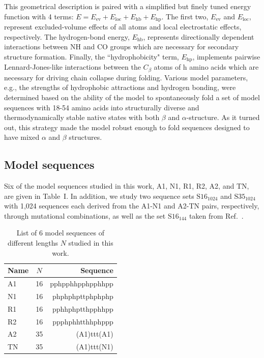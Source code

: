 \documentclass[
aip,
rsi,%
amsmath,amssymb,
reprint,%
]{revtex4-1}
\begin{document}
This geometrical description is paired with a simplified but finely tuned energy function with 4 terms: $E= E_\mathrm{ev} + E_\mathrm{loc} + E_\mathrm{hb} + E_\mathrm{hp}$. The first two, $E_\mathrm{ev}$ and $E_\mathrm{loc}$, represent excluded-volume effects of all atoms and local electrostatic effects, respectively. The hydrogen-bond energy, $E_\mathrm{hb}$, represents directionally dependent interactions between NH and CO groups which are necessary for secondary structure formation. Finally, the ``hydrophobicity" term, $E_\mathrm{hp}$, implements pairwise Lennard-Jones-like interactions between the $C_\beta$ atoms of h amino acids which are necessary for driving chain collapse during folding. Various model parameters, e.g., the strengths of hydrophobic attractions and hydrogen bonding, were determined based on the ability of the model to spontaneously fold a set of model sequences with 18-54 amino acids into  structurally diverse and thermodynamically stable native states with both $\beta$ and $\alpha$-structure. As it turned out, this strategy made the model robust enough to fold sequences designed to have mixed $\alpha$ and $\beta$ structures. 

\subsection{Model sequences}
\noindent
Six of the model sequences studied in this work, A1, N1, R1, R2, A2, and TN, are given in Table~I. In addition, we study two sequence sets $\mathrm{S16}_{1024}$  and $\mathrm{S35}_{1024}$ with 1,024 sequences each derived from the A1-N1 and A2-TN pairs, respectively, through mutational combinations, as well as the set $\mathrm{S16}_{144}$ taken from  Ref.~\protect{}. 
 
\begin{table}
\caption{\label{tab1} List of 6 model sequences of different lengths $N$ studied in this work.}
\begin{ruledtabular}
\begin{tabular}{lcr}
Name & $N$ & Sequence \\
\hline
A1 & 16 & pphpphhpphpphhpp \\
N1 & 16 & phphphpttphphphp \\
R1 & 16 & pphhphptthpphhpp\\
R2 & 16 & ppphphhtthhphppp\\
A2 & 35 & (A1)ttt(A1)\\
TN & 35 & (A1)ttt(N1)\\
\end{tabular}
\end{ruledtabular}
\end{table}
\end{document}
